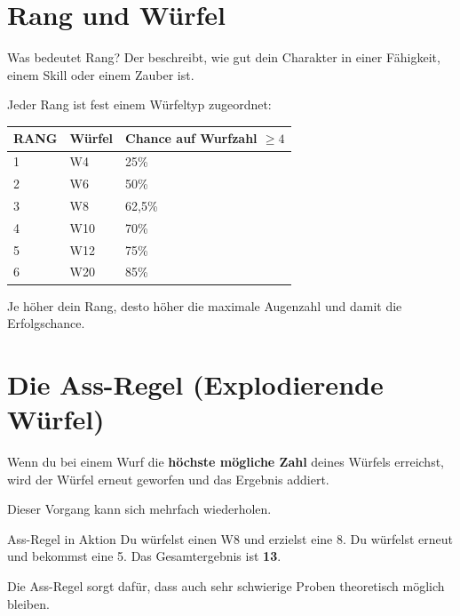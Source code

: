 \section{Rang und Würfel}

\begin{rulebox}{Was bedeutet Rang?}
	Der  beschreibt, wie gut dein Charakter in einer Fähigkeit,
	einem Skill oder einem Zauber ist.
\end{rulebox}

Jeder Rang ist fest einem Würfeltyp zugeordnet:

\begin{center}
	\begin{tabular}{lll}
		\toprule
		\textbf{RANG} & \textbf{Würfel} & \textbf{Chance auf Wurfzahl $\ge 4$} \\
		\midrule
		1 & W4  & 25\% \\
		2 & W6  & 50\% \\
		3 & W8  & 62{,}5\% \\
		4 & W10 & 70\% \\
		5 & W12 & 75\% \\
		6 & W20 & 85\% \\
		\bottomrule
	\end{tabular}
\end{center}

Je höher dein Rang, desto höher die maximale Augenzahl und damit die
Erfolgschance.

\section{Die Ass-Regel (Explodierende Würfel)}

\begin{rulebox}{}
	Wenn du bei einem Wurf die \textbf{höchste mögliche Zahl} deines Würfels
	erreichst, wird der Würfel erneut geworfen und das Ergebnis addiert.
\end{rulebox}

Dieser Vorgang kann sich mehrfach wiederholen.

\begin{examplebox}{Ass-Regel in Aktion}
	Du würfelst einen W8 und erzielst eine 8.  
	Du würfelst erneut und bekommst eine 5.  
	Das Gesamtergebnis ist \textbf{13}.
\end{examplebox}

Die Ass-Regel sorgt dafür, dass auch sehr schwierige Proben theoretisch
möglich bleiben.

